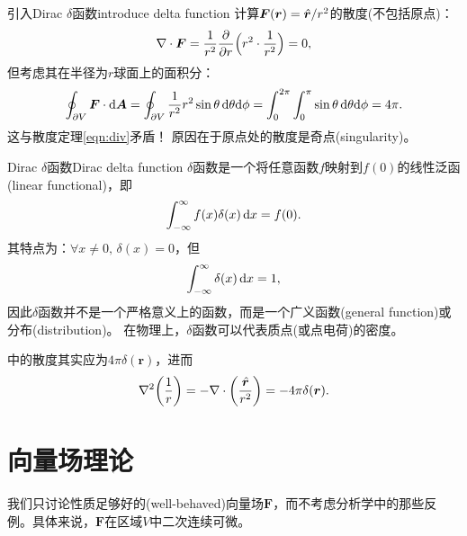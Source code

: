 \begin{example}{引入Dirac $\delta$函数}{introduce delta function}
    计算$\bm F(\bm r) = \mathop{}\!\hat{\bm{r}}/r^2$的散度(不包括原点)：
    \[
        \nabla\cdot\bm F = \frac1{r^2}\frac{\partial^{}}{\partial{r}^{}}\Bigl(r^2 \cdot \frac1{r^2}\Bigr) = 0,
    \]
    但考虑其在半径为$r$球面上的面积分：
    \[
        \oint_{\partial V}\bm F \cdot \mathop{}\!\mathrm{d}\bm A = \oint_{\partial V}\frac1{r^2}r^2\sin\theta\mathop{}\!\mathrm{d}\theta\mathrm{d}\phi = \int_0^{2\pi}\int_0^\pi\sin\theta\mathop{}\!\mathrm{d}\theta\mathrm{d}\phi = 4\pi.
    \]
    这与散度定理\eqref{eqn:div}矛盾！
    原因在于原点处的散度是奇点(singularity)。
\end{example}
\begin{definition}{Dirac $\delta$函数}{Dirac delta function}
    $\delta$函数是一个将任意函数$f$映射到$f(0)$的线性泛函(linear functional)，即
    \begin{equation}
        \label{eq:ed-dirac-delta-sifting}
        \int_{-\infty}^\infty f(x)\delta(x)\mathop{}\!\mathrm{d} x = f(0).
    \end{equation}
    其特点为：$\forall x \neq 0,\,\delta(x) = 0$，但
    \begin{equation}
        \label{eq:ed-dirac-delta-normalization}
        \int_{-\infty}^\infty\delta(x)\mathop{}\!\mathrm{d} x = 1,
    \end{equation}
    因此$\delta$函数并不是一个严格意义上的函数，而是一个广义函数(general function)或分布(distribution)。
    在物理上，$\delta$函数可以代表质点(或点电荷)的密度。
\end{definition}

\begin{corollary}
     中的散度其实应为$4\pi\delta(\bm r)$，进而
    \begin{equation}
        \nabla^2\biggl(\frac1r\biggr) = -\nabla\cdot\biggl(\frac{\mathop{}\!\hat{\bm{r}}}{r^2}\biggr) = -4\pi\delta(\bm r).
    \end{equation}
\end{corollary}

\section{向量场理论}

我们只讨论性质足够好的(well-behaved)向量场$\bm F$，而不考虑分析学中的那些反例。具体来说，$\bm F$在区域$V$中二次连续可微。

